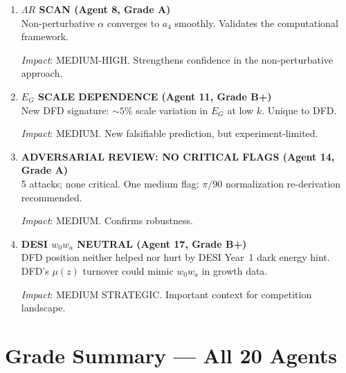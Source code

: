 \documentclass[11pt,a4paper]{article}
\begin{document}
\begin{enumerate}[label=\textbf{\arabic*.}, leftmargin=1.5cm]
\textit{Impact}: HIGH STRATEGIC. First DFD cosmology publication.

\item \textbf{$\Lambda R$ SCAN (Agent 8, Grade A)}\\
Non-perturbative $\alpha$ converges to $a_4$ smoothly. Validates the computational framework.

\textit{Impact}: MEDIUM-HIGH. Strengthens confidence in the non-perturbative approach.

\item \textbf{$E_G$ SCALE DEPENDENCE (Agent 11, Grade B+)}\\
New DFD signature: $\sim 5\%$ scale variation in $E_G$ at low $k$. Unique to DFD.

\textit{Impact}: MEDIUM. New falsifiable prediction, but experiment-limited.

\item \textbf{ADVERSARIAL REVIEW: NO CRITICAL FLAGS (Agent 14, Grade A)}\\
5 attacks; none critical. One medium flag: $\pi/90$ normalization re-derivation recommended.

\textit{Impact}: MEDIUM. Confirms robustness.

\item \textbf{DESI $w_0 w_a$ NEUTRAL (Agent 17, Grade B+)}\\
DFD position neither helped nor hurt by DESI Year~1 dark energy hint. DFD's $\mu(z)$ turnover could mimic $w_0 w_a$ in growth data.

\textit{Impact}: MEDIUM STRATEGIC. Important context for competition landscape.
\end{enumerate}


\section{Grade Summary --- All 20 Agents}
\label{sec:grades}
\end{document}
